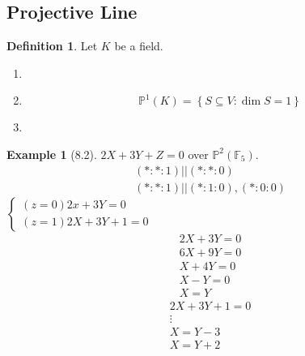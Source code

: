 \documentclass[12pt,openany]{book}
\theoremstyle{definition}
\newtheorem{definition}{Definition}[chapter]
\newtheorem{example}{Example}[chapter]
\newcommand{\set}[1]{\left\{#1\right\}}
\newcommand{\F}{\mathbb{F}}
\newcommand{\of}[1]{\left( #1 \right)}
\begin{document}
	\subsection{Projective Line}
	
	\begin{tcolorbox}[colback=white,colframe=defcolor,arc=5pt,title={\color{white}\bf Projective Line}]
		\begin{definition}
			Let $K$ be a field. \begin{enumerate}[(1)]
				\item 
				\item \[
				\mathbb{P}^1(K)=\set{S\subseteq V:\dim{S}=1}
				\]
				\item 
			\end{enumerate}
		\end{definition}
	\end{tcolorbox}
	
	\begin{example}[8.2]
		$2X+3Y+Z=0$ over $\mathbb{P}^2\of{\F_5}$. \begin{align*}
		(*:*:1) || (*:*:0)\\
		(*:*:1) || (*:1:0) , (*:0:0)
		\end{align*}
		$\begin{cases}
			(z=0) 2x+3Y=0\\
			(z=1) 2X+3Y+1=0
		\end{cases}$
		\begin{align*}
		2X+3Y=0\\
		6X+9Y=0\\
		X+4Y=0\\
		X-Y=0\\
		X=Y
		\end{align*}
		\begin{align*}
		2X+3Y+1=0\\
		\vdots\\
		X=Y-3\\
		X=Y+2
		\end{align*}
	\end{example}
	
	\begin{tcolorbox}[colback=white,colframe=lemcolor,arc=5pt,title={\color{white}\bf }]
		
	\end{tcolorbox}
	
	\begin{tcolorbox}[colback=white,colframe=lemcolor,arc=5pt,title={\color{white}\bf }]
		
	\end{tcolorbox}
	
\end{document}
